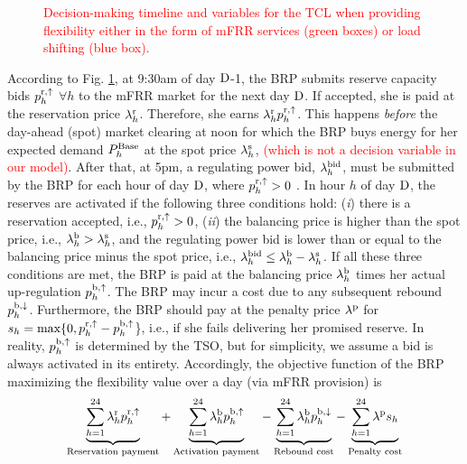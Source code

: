 \documentclass[11pt,a4paper]{article}
\begin{document}
\begin{figure}[t]
    \centering
    
    \caption{\textcolor{red}{Decision-making timeline and variables for the TCL when providing flexibility either in the form of mFRR services (green boxes) or load shifting (blue box).}}
    \label{fig:timeline_mfrr_variables}
\end{figure}


According to Fig. \ref{fig:timeline_mfrr_variables}, at 9:30am of day $\rm{D}$-1, the BRP submits reserve capacity bids $p_{h}^{\rm{r},\uparrow}$ $\forall{h}$ to the mFRR market for the next day $\rm{D}$. If accepted, she is paid at the reservation price $\lambda_{h}^{\rm{r}}$. Therefore, she earns $\lambda_{h}^{\rm{r}}p_{h}^{\rm{r},\uparrow}$. This happens \textit{before} the day-ahead (spot) market clearing at noon for which the BRP buys energy for her expected demand $P_{h}^{\rm{Base}}$ at the spot price $\lambda_{h}^{\rm{s}}$, \textcolor{red}{(which is not a decision variable in our model)}. After that, at 5pm, a regulating power bid, $\lambda_{h}^{\rm{bid}}$, must be submitted by the BRP for each hour of day $\rm{D}$, where $p_{h}^{\rm{r},\uparrow} > 0$ \cite{energinet:Systemydelser}. In hour $h$ of day $\rm{D}$, the reserves are activated if the following three conditions hold: (\textit{i}) there is a reservation accepted, i.e., $p_{h}^{\rm{r},\uparrow} > 0$, (\textit{ii}) the balancing price is higher than the spot price, i.e., $\lambda_{h}^{\rm{b}} > \lambda_{h}^{\rm{s}}$, and the regulating power bid is lower than or equal to the balancing price minus the spot price, i.e., $\lambda_{h}^{\rm{bid}} \leq  \lambda_{h}^{\rm{b}} - \lambda_{h}^{\rm{s}}$. If all these three conditions are met, the BRP is paid at the balancing price $\lambda_{h}^{\rm{b}}$ times her actual up-regulation $p_{h}^{\rm{b},\uparrow}$. The BRP may  incur a cost due to any subsequent rebound $p_{h}^{\rm{b},\downarrow}$. Furthermore, the BRP should pay at the penalty price $\lambda^{\rm{p}}$ for $s_{h} = \text{max}\{0, p_{h}^{\rm{r},\uparrow} - p_{h}^{\rm{b},\uparrow}$\}, i.e., if she fails delivering her promised reserve. In reality, $p_{h}^{\rm{b},\uparrow}$ is determined by the TSO, but for simplicity, we assume a bid is always activated in its entirety.
Accordingly, the objective function of the BRP maximizing the flexibility value over a day (via mFRR provision) is
%
\begin{align}\label{eq:mFRRObjective}
    \underbrace{\sum_{h=1}^{24}\lambda_{h}^{\rm{r}} p^{\rm{r}, \uparrow}_{h}}_{\textrm{Reservation payment}} + \underbrace{\sum_{h=1}^{24}  \lambda_{h}^{\rm{b}} p^{\rm{b},\uparrow}_{h}}_{\textrm{Activation payment}} - \underbrace{\sum_{h=1}^{24}  \lambda_{h}^{\rm{b}} p^{\rm{b},\downarrow}_{h}}_{\textrm{Rebound cost}} - \underbrace{ \sum_{h=1}^{24}  \lambda^{\rm{p}}s_{h}}_{\textrm{Penalty cost}}
\end{align}
\end{document}
